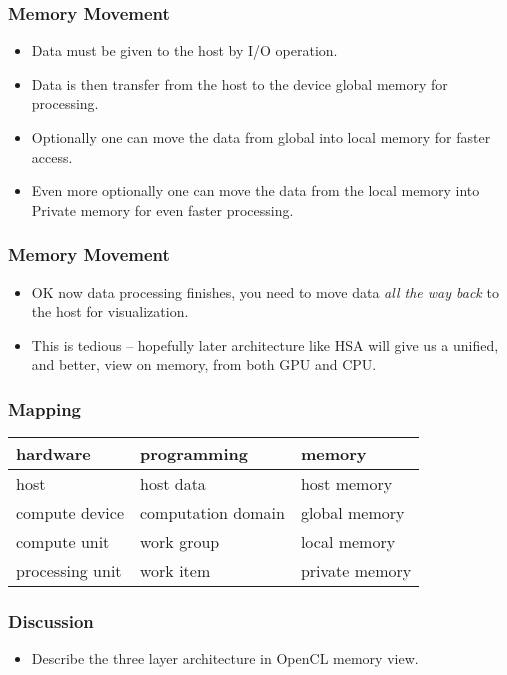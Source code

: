 \documentclass{beamer}
\begin{document}
\begin{frame}
  \frametitle{Memory Movement}
  \begin{itemize}
  \item Data must be given to the host by I/O operation.
  \item Data is then transfer from the host to the device global memory
    for processing.
  \item Optionally one can move the data from global into local
    memory for faster access.
  \item Even more optionally one can move the data from the local
    memory into Private memory for even faster processing.
  \end{itemize}
\end{frame}

\begin{frame}
  \frametitle{Memory Movement}
  \begin{itemize}
  \item OK now data processing finishes, you need to move data {\em
    all the way back} to the host for visualization.
  \item This is tedious -- hopefully later architecture like HSA
    will give us a unified, and better, view on memory, from both
    GPU and CPU.
  \end{itemize}
\end{frame}

\begin{frame}
  \frametitle{Mapping}
  \begin{center}
    \begin{tabular}{|l|l|l|} \hline
      hardware & programming & memory  \\  \hline \hline
      host & host data & host memory   \\  \hline \hline
      compute device & computation domain & global memory  \\  \hline
      compute unit & work group & local memory \\ \hline 
      processing unit & work item & private memory \\ \hline
    \end{tabular}
  \end{center}
\end{frame}

\begin{frame}
  \frametitle{Discussion}
  \begin{itemize}
  \item Describe the three layer architecture in OpenCL memory view.
  \end{itemize}
\end{frame}
\end{document}
